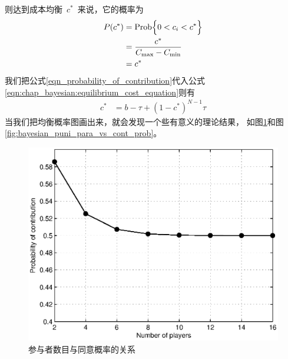 则达到成本均衡~$c^*$~来说，它的概率为
\begin{align} 
    P(c^*) &= \text{Prob} \Bigl\{ 0 < c_i < c^*\Bigr\} \notag\\ 
    &= \frac{c^*}{C_{\max}-C_{\min}} \notag\\
    &= c^* 
    \label{eqn_probability_of_contribution} 
\end{align}
我们把公式\ref{eqn_probability_of_contribution}代入公式\ref{eqn:chap_bayesian:equilibrium_cost_equation}则有
\begin{align*} 
    c^* &= b - \tau + (1-c^*)^{N-1}\tau
\end{align*}
当我们把均衡概率图画出来，就会发现一个些有意义的理论结果，
如图\ref{fig:bayesian_user_numb_vs_contr_prob}和图\ref{fig:bayesian_puni_para_vs_cont_prob}。
\begin{figure}[tb]
\begin{centering}
\includegraphics[scale=0.7]{../figures/bayesian_user_number_vs_contribute_probability.eps}
\caption{参与者数目与同意概率的关系}
\label{fig:bayesian_user_numb_vs_contr_prob}
\end{centering}
\end{figure}
